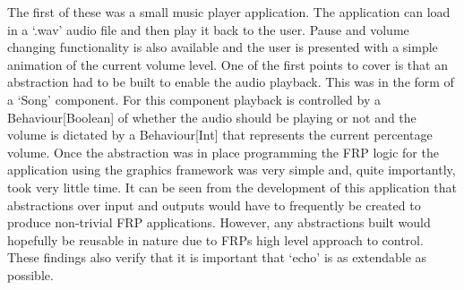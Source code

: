     The first of these was a small music player application. The application
    can load in a `.wav' audio file and then play it back to the user. Pause and volume changing functionality
    is also available and the user is presented with a simple animation of the current volume level. One of the
    first points to cover is that an abstraction had to be built to enable the audio playback. This was in the form
    of a `Song' component. For this component playback is controlled by a Behaviour[Boolean] of whether the audio
    should be playing or not and the volume is dictated by a Behaviour[Int] that represents the current percentage
    volume. Once the abstraction was in place programming the FRP logic for the application using the 
    graphics framework was very simple and, quite importantly, took very little time. It can be seen from
    the development of this application that abstractions over input and outputs would have to frequently be
    created to produce non-trivial FRP applications. However, any abstractions built would hopefully be
    reusable in nature due to FRPs high level approach to control. These findings also verify that it
    is important that `echo' is as extendable as possible.